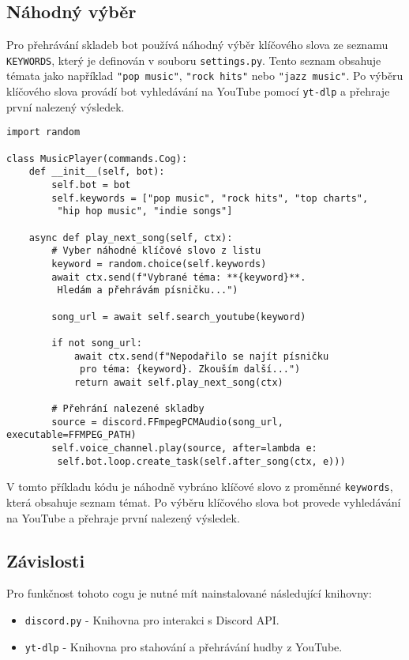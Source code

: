 \documentclass[12pt, a4paper]{report}
\begin{document}
\subsection{Náhodný výběr}
Pro přehrávání skladeb bot používá náhodný výběr klíčového slova ze seznamu \texttt{KEYWORDS}, který je definován v souboru \texttt{settings.py}. Tento seznam obsahuje témata jako například \texttt{"pop music"}, \texttt{"rock hits"} nebo \texttt{"jazz music"}. Po výběru klíčového slova provádí bot vyhledávání na YouTube pomocí \texttt{yt-dlp} a přehraje první nalezený výsledek.

\begin{lstlisting}[style=Python, caption=Náhodný Výběr klíčového slova a přehrávání hudby]
import random

class MusicPlayer(commands.Cog):
    def __init__(self, bot):
        self.bot = bot
        self.keywords = ["pop music", "rock hits", "top charts",
         "hip hop music", "indie songs"]

    async def play_next_song(self, ctx):
        # Vyber náhodné klíčové slovo z listu
        keyword = random.choice(self.keywords)
        await ctx.send(f"Vybrané téma: **{keyword}**.
         Hledám a přehrávám písničku...")

        song_url = await self.search_youtube(keyword)

        if not song_url:
            await ctx.send(f"Nepodařilo se najít písničku
             pro téma: {keyword}. Zkouším další...")
            return await self.play_next_song(ctx)

        # Přehrání nalezené skladby
        source = discord.FFmpegPCMAudio(song_url, executable=FFMPEG_PATH)
        self.voice_channel.play(source, after=lambda e:
         self.bot.loop.create_task(self.after_song(ctx, e)))
\end{lstlisting}

V tomto příkladu kódu je náhodně vybráno klíčové slovo z proměnné \texttt{keywords}, která obsahuje seznam témat. Po výběru klíčového slova bot provede vyhledávání na YouTube a přehraje první nalezený výsledek.

\subsection{Závislosti}
Pro funkčnost tohoto cogu je nutné mít nainstalované následující knihovny:
\begin{itemize}
    \item \texttt{discord.py} - Knihovna pro interakci s Discord API.
    \item \texttt{yt-dlp} - Knihovna pro stahování a přehrávání hudby z YouTube.
\end{itemize}
\end{document}

